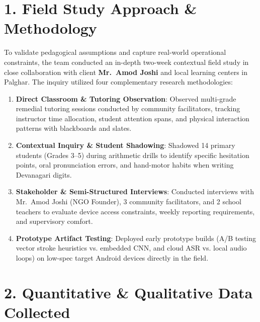 \documentclass[10pt,a4paper]{article}
\begin{document}
\section*{1. Field Study Approach \& Methodology}
To validate pedagogical assumptions and capture real-world operational constraints, the team conducted an in-depth two-week contextual field study in close collaboration with client \textbf{Mr.~Amod Joshi} and local learning centers in Palghar. The inquiry utilized four complementary research methodologies:
\begin{enumerate}[itemsep=2pt]
    \item \textbf{Direct Classroom \& Tutoring Observation}: Observed multi-grade remedial tutoring sessions conducted by community facilitators, tracking instructor time allocation, student attention spans, and physical interaction patterns with blackboards and slates.
    \item \textbf{Contextual Inquiry \& Student Shadowing}: Shadowed 14 primary students (Grades 3--5) during arithmetic drills to identify specific hesitation points, oral pronunciation errors, and hand-motor habits when writing Devanagari digits.
    \item \textbf{Stakeholder \& Semi-Structured Interviews}: Conducted interviews with Mr.~Amod Joshi (NGO Founder), 3 community facilitators, and 2 school teachers to evaluate device access constraints, weekly reporting requirements, and supervisory comfort.
    \item \textbf{Prototype Artifact Testing}: Deployed early prototype builds (A/B testing vector stroke heuristics vs. embedded CNN, and cloud ASR vs. local audio loops) on low-spec target Android devices directly in the field.
\end{enumerate}

\section*{2. Quantitative \& Qualitative Data Collected}
\end{document}
